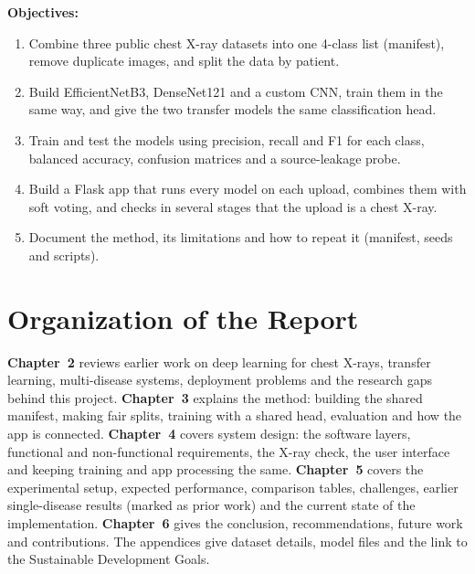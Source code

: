 \textbf{Objectives:}
\begin{enumerate}
    \item Combine three public chest X-ray datasets into one 4-class list (manifest), remove duplicate images, and split the data by patient.
    \item Build EfficientNetB3, DenseNet121 and a custom CNN, train them in the same way, and give the two transfer models the same classification head.
    \item Train and test the models using precision, recall and F1 for each class, balanced accuracy, confusion matrices and a source-leakage probe.
    \item Build a Flask app that runs every model on each upload, combines them with soft voting, and checks in several stages that the upload is a chest X-ray.
    \item Document the method, its limitations and how to repeat it (manifest, seeds and scripts).
\end{enumerate}

\section{Organization of the Report}

\textbf{Chapter~2} reviews earlier work on deep learning for chest X-rays, transfer learning, multi-disease systems, deployment problems and the research gaps behind this project. \textbf{Chapter~3} explains the method: building the shared manifest, making fair splits, training with a shared head, evaluation and how the app is connected. \textbf{Chapter~4} covers system design: the software layers, functional and non-functional requirements, the X-ray check, the user interface and keeping training and app processing the same. \textbf{Chapter~5} covers the experimental setup, expected performance, comparison tables, challenges, earlier single-disease results (marked as prior work) and the current state of the implementation. \textbf{Chapter~6} gives the conclusion, recommendations, future work and contributions. The appendices give dataset details, model files and the link to the Sustainable Development Goals.
